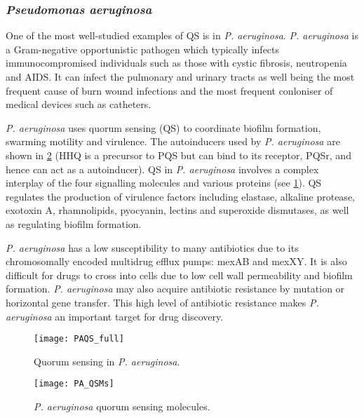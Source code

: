 \subsubsection{\textit{Pseudomonas aeruginosa}\label{sec:PAautoinducers}}

One of the most well-studied examples of QS is in \textit{P. aeruginosa}.
\textit{P. aeruginosa} is a Gram-negative opportunistic pathogen which typically infects immunocompromised individuals such as those with cystic fibrosis, neutropenia and AIDS. It can infect the pulmonary and urinary tracts as well being the most frequent cause of burn wound infections and the most frequent conloniser of medical devices such as catheters\cite{Bodey1983}.

\textit{P. aeruginosa} uses quorum sensing (QS) to coordinate biofilm formation, swarming motility and virulence. The autoinducers used by \textit{P. aeruginosa} are shown in \ref{fgr:PA_autoinducers} (HHQ  is a precursor to PQS  but can bind to its receptor, PQSr, and hence can act as a autoinducer\cite{Xiao2006}). QS in \textit{P. aeruginosa} involves a complex interplay of the four signalling molecules and various proteins (see \ref{fgr:PA_QS})\cite{Dubern2008}. QS regulates the production of virulence factors including elastase, alkaline protease, exotoxin A, rhamnolipids, pyocyanin, lectins and superoxide dismutases, as well as regulating biofilm formation.

\textit{P. aeruginosa} has a low susceptibility to many antibiotics due to its chromosomally encoded multidrug efflux pumps: mexAB and mexXY\cite{Poole2004}. It is also difficult for drugs to cross into cells due to low cell wall permeability and biofilm formation. \textit{P. aeruginosa} may also acquire antibiotic resistance by mutation or horizontal gene transfer\cite{cornelis2008pseudomonas}. This high level of antibiotic resistance makes \textit{P. aeruginosa} an important target for drug discovery.

\begin{figure}[H]
	\begin{center}
		\texttt{[image: PAQS\_full]}
		\caption{Quorum sensing in \textit{P. aeruginosa}\cite{Dubern2008}. \label{fgr:PA_QS}}
	\end{center}
\end{figure}


\begin{figure}[H]
	\begin{center}
		\texttt{[image: PA\_QSMs]}
		\caption{\textit{P. aeruginosa} quorum sensing molecules. \label{fgr:PA_autoinducers}}
	\end{center}
\end{figure}




